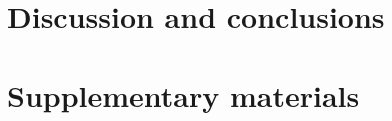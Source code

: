 \documentclass{article}
\DeclareMathOperator*{\argmin}{arg\,min}
\DeclareMathOperator*{\sign}{sign}
\newcommand{\ZZ}{\mathbb Z}
\newcommand{\RR}{\mathbb R}
\begin{document}
\section{Discussion and conclusions}







\section{Supplementary materials}
\label{sec:peakseg_details}



\end{document}

